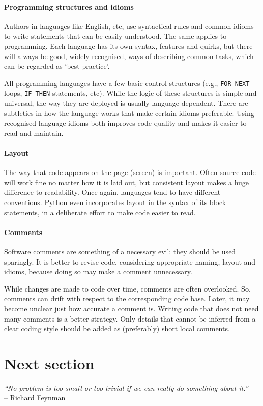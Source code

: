 \paragraph{Programming structures and idioms} Authors in languages like English, etc, use syntactical rules and common idioms to write statements that can be easily understood. The same applies to programming. Each language has its own syntax, features and quirks, but there will always be good, widely-recognised, ways of describing common tasks, which can be regarded as `best-practice'.

All programming languages have a few basic control structures (e.g., \texttt{FOR-NEXT} loops, \texttt{IF-THEN} statements, etc). While the logic of these structures is simple and universal, the way they are deployed is usually language-dependent. There are subtleties in how the language works that make certain idioms preferable. Using recognised language idioms both improves code quality and makes it easier to read and maintain. 

  

\paragraph{Layout} The way that code appears on the page (screen) is important. Often source code will work fine no matter how it is laid out, but consistent layout makes a huge difference to readability. Once again, languages tend to have different conventions. Python even incorporates layout in the syntax of its block statements, in a deliberate effort to make code easier to read.

\paragraph{Comments} Software comments are something of a necessary evil: they should be used sparingly. It is better to revise code, considering appropriate naming, layout and idioms, because doing so may make a comment unnecessary.

While changes are made to code over time, comments are often overlooked. So, comments can drift with respect to the corresponding code base. Later, it may become unclear just how accurate a comment is. Writing code that does not need many comments is a better strategy. Only details that cannot be inferred from a clear coding style should be added as (preferably) short local comments.

\section{Next section}
\begin{flushright}
\textit{“No problem is too small or too trivial if we can really do something about it.”} \\
-- Richard Feynman 
\end{flushright}

